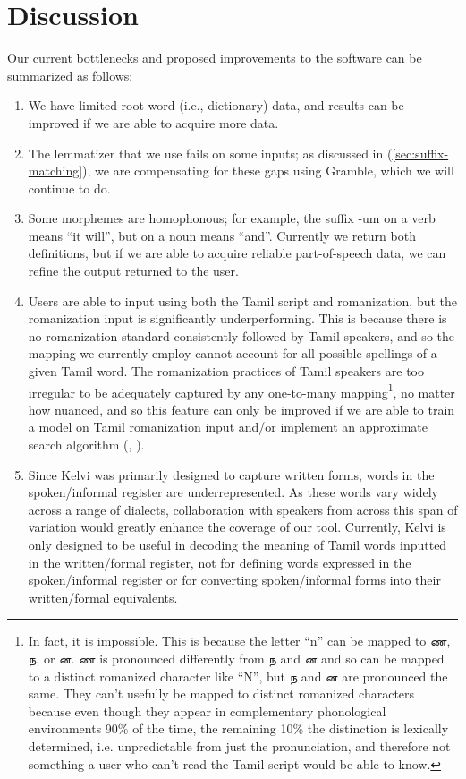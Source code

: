 \documentclass[11pt]{article}
\begin{document}
\section{Discussion}
Our current bottlenecks and proposed improvements to the software can be summarized as follows:
\begin{enumerate}
  \item We have limited root-word (i.e., dictionary) data, and results can be improved if we are able to acquire more data. 
  \item The lemmatizer that we use fails on some inputs; as discussed in (\ref{sec:suffix-matching}), we are compensating for these gaps using Gramble, which we will continue to do. 
  \item Some morphemes are homophonous; for example, the suffix -um on a verb means “it will”, but on a noun means “and”. Currently we return both definitions, but if we are able to acquire reliable part-of-speech data, we can refine the output returned to the user. 
  \item Users are able to input using both the Tamil script and romanization, but the romanization input is significantly underperforming. This is because there is no romanization standard consistently followed by Tamil speakers, and so the mapping we currently employ cannot account for all possible spellings of a given Tamil word. The romanization practices of Tamil speakers are too irregular to be adequately captured by any one-to-many mapping\footnote{In fact, it is impossible. This is because the letter “n” can be mapped to \foreignlanguage{tamil}{ண}, \foreignlanguage{tamil}{ந}, or \foreignlanguage{tamil}{ன}. \foreignlanguage{tamil}{ண} is pronounced differently from \foreignlanguage{tamil}{ந} and \foreignlanguage{tamil}{ன} and so can be mapped to a distinct romanized character like “N”, but \foreignlanguage{tamil}{ந} and \foreignlanguage{tamil}{ன} are pronounced the same. They can’t usefully be mapped to distinct romanized characters because even though they appear in complementary phonological environments 90\% of the time, the remaining 10\% the distinction is lexically determined, i.e. unpredictable from just the pronunciation, and therefore not something a user who can’t read the Tamil script would be able to know.}, no matter how nuanced, and so this feature can only be improved if we are able to train a model on Tamil romanization input and/or implement an approximate search algorithm (\citealp{pine-etal-2025-zero}, \citealp{littell_waldayu_2017}).
  \item Since Kelvi was primarily designed to capture written forms, words in the spoken/informal register are underrepresented. As these words vary widely across a range of dialects, collaboration with speakers from across this span of variation would greatly enhance the coverage of our tool. Currently, Kelvi is only designed to be useful in decoding the meaning of Tamil words inputted in the written/formal register, not for defining words expressed in the spoken/informal register or for converting spoken/informal forms into their written/formal equivalents.
\end{enumerate}
\end{document}
